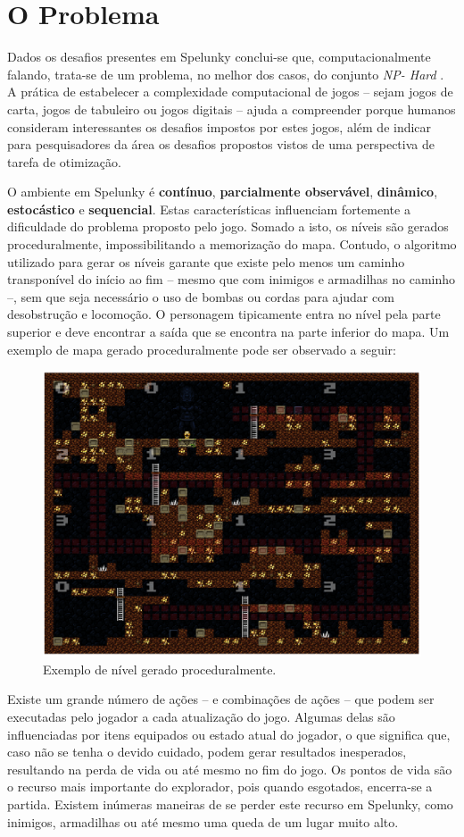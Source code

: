 \chapter{\label{chap:problem}O Problema}
Dados os desafios presentes em Spelunky conclui-se que, computacionalmente
falando, trata-se de um problema, no melhor dos casos, do conjunto \textit{NP-
Hard} \cite{SPELUNKYHARD}. A prática de estabelecer a complexidade computacional
de jogos -- sejam jogos de carta, jogos de tabuleiro ou jogos digitais -- ajuda
a compreender  porque humanos consideram interessantes os desafios impostos por
estes jogos, além de indicar para pesquisadores da área os desafios propostos
vistos de uma perspectiva de tarefa de otimização.

O ambiente em Spelunky é \textbf{contínuo}, \textbf{parcialmente observável},
\textbf{dinâmico}, \textbf{estocástico} e \textbf{sequencial}. Estas
características influenciam fortemente a dificuldade do problema proposto pelo
jogo. Somado a isto, os níveis são gerados proceduralmente, impossibilitando a
memorização do mapa. Contudo, o algoritmo utilizado para gerar os níveis garante
que existe pelo menos um caminho transponível do início ao fim -- mesmo que com
inimigos e armadilhas no caminho --, sem que seja necessário o uso de bombas ou
cordas para ajudar com desobstrução e locomoção. O personagem tipicamente entra
no nível pela parte superior e deve encontrar a saída que se encontra na parte
inferior do mapa. Um exemplo de mapa gerado proceduralmente pode ser observado a
seguir:

\begin{figure}[htb!]
\centering\includegraphics[width=.65\textwidth]{fig/spelunky-level-example.png}
\caption {\label{fig:spelunky-level-example}Exemplo de nível gerado
proceduralmente.} \end{figure}

Existe um grande número de ações -- e combinações de ações -- que podem ser
executadas pelo jogador a cada atualização do jogo. Algumas delas são
influenciadas por itens equipados ou estado atual do jogador, o que significa
que, caso não se tenha o devido cuidado, podem gerar resultados inesperados,
resultando na perda de vida ou até mesmo no fim do jogo. Os pontos de vida são o
recurso mais importante do explorador, pois quando esgotados, encerra-se a
partida. Existem inúmeras maneiras de se perder este recurso em Spelunky, como
inimigos, armadilhas ou até mesmo uma queda de um lugar muito alto.

